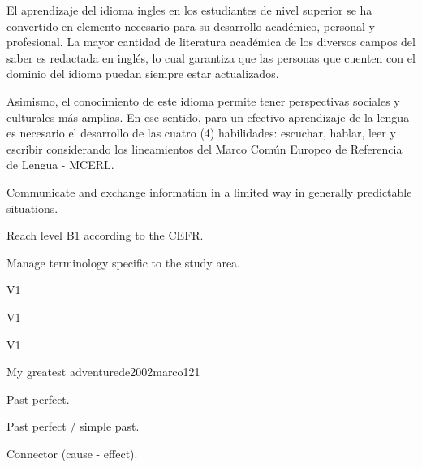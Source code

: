 \begin{syllabus}

\begin{justification}
El aprendizaje del idioma ingles en los estudiantes de nivel superior se ha 
convertido en elemento necesario para su desarrollo académico, personal y 
profesional. La mayor cantidad de literatura académica de los diversos 
campos del saber es redactada en inglés, lo cual garantiza que las personas 
que cuenten con el dominio del idioma puedan siempre estar actualizados. 

Asimismo, el conocimiento de este idioma permite tener perspectivas sociales y 
culturales más amplias. En ese sentido, para un efectivo aprendizaje de la 
lengua es necesario el desarrollo de las cuatro (4) habilidades: 
escuchar, hablar, leer y escribir considerando los lineamientos del 
Marco Común Europeo de Referencia de Lengua - MCERL.
\end{justification}

\begin{goals}
\item Communicate and exchange information in a limited way in generally predictable situations.
\item Reach level B1 according to the CEFR.
\item Manage terminology specific to the study area.
\end{goals}

\begin{outcomes}{V1}
\item {}
\end{outcomes}

\begin{specificoutcomes}{V1}
\item {}
\item {}
\item {}
\item {}
\end{specificoutcomes}

\begin{competences}{V1}
    \item {}
\end{competences}

\begin{unit}{My greatest adventure}{}{de2002marco}{12}{1}
   \begin{topics}
      \item Past perfect.
      \item Past perfect / simple past.
      \item Connector (cause - effect).
   \end{topics}


\end{unit}
\end{syllabus}
